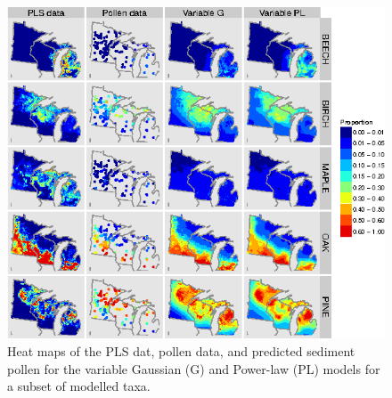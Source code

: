 \begin{figure}
\centering
\includegraphics[width=7in]{figures/map_pls_pollen.png}
\caption{Heat maps of the PLS dat, pollen data, and predicted sediment
  pollen for the variable Gaussian (G) and Power-law (PL) models for a
  subset of modelled taxa.}
\label{fig:maps_pp}
\end{figure}



